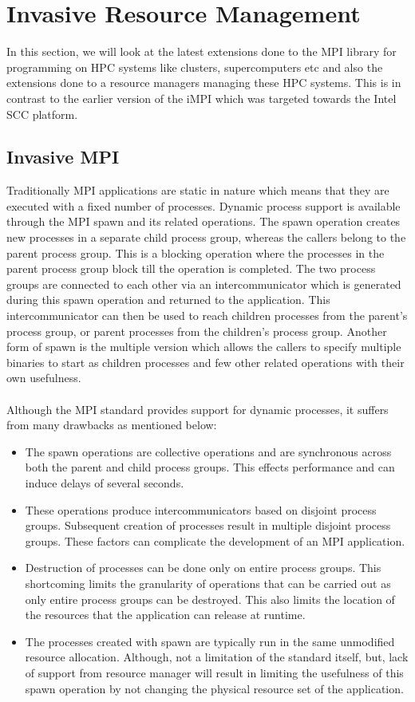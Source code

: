 \section{Invasive Resource Management}
In this section, we will look at the latest extensions done to the MPI library for programming on HPC systems like clusters, supercomputers etc and also the extensions done to a resource managers managing these HPC systems. This is in contrast to the earlier version of the iMPI which was targeted towards the Intel SCC platform.
\subsection{Invasive MPI}
Traditionally MPI applications are static in nature which means that they are executed with a fixed number of processes. Dynamic process support is available through the MPI spawn and its related operations. The spawn operation creates new processes in a separate child process group, whereas the callers belong to the parent process group. This is a blocking operation where the processes in the parent process group block till the operation is completed. The two process groups are connected to each other via an intercommunicator which is generated during this spawn operation and returned to the application. This intercommunicator can then be used to reach children processes from the parent's process group, or parent processes from the children's process group. Another form of spawn is the multiple version which allows the callers to specify multiple binaries to start as children processes and few other related operations with their own usefulness.\\ \\
\noindent
Although the MPI standard provides support for dynamic processes, it suffers from many drawbacks as mentioned below:
\begin{itemize}
\item The spawn operations are collective operations and are synchronous across both the parent and child process groups. This effects performance and can induce delays of several seconds.
\item These operations produce intercommunicators based on disjoint process groups. Subsequent creation of processes result in multiple disjoint process groups. These factors can complicate the development of an MPI application.
\item Destruction of processes can be done only on entire process groups. This shortcoming limits the granularity of operations that can be carried out as only entire process groups can be destroyed. This also limits the location of the resources that the application can release at runtime.
\item The processes created with spawn are typically run in the same unmodified resource allocation. Although, not a limitation of the standard itself, but, lack of support from resource manager will result in limiting the usefulness of this spawn operation by not changing the physical resource set of the application.
\end{itemize}
